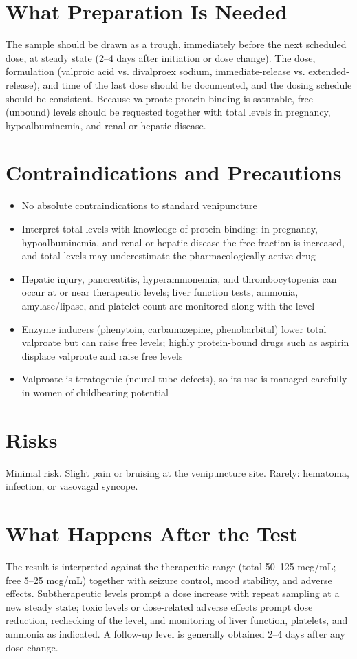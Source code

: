 \section*{What Preparation Is Needed}
The sample should be drawn as a trough, immediately before the next scheduled dose, at steady state (2--4 days after initiation or dose change). The dose, formulation (valproic acid vs. divalproex sodium, immediate-release vs. extended-release), and time of the last dose should be documented, and the dosing schedule should be consistent. Because valproate protein binding is saturable, free (unbound) levels should be requested together with total levels in pregnancy, hypoalbuminemia, and renal or hepatic disease.
\section*{Contraindications and Precautions}
\begin{itemize}
  \item No absolute contraindications to standard venipuncture
  \item Interpret total levels with knowledge of protein binding: in pregnancy, hypoalbuminemia, and renal or hepatic disease the free fraction is increased, and total levels may underestimate the pharmacologically active drug
  \item Hepatic injury, pancreatitis, hyperammonemia, and thrombocytopenia can occur at or near therapeutic levels; liver function tests, ammonia, amylase/lipase, and platelet count are monitored along with the level
  \item Enzyme inducers (phenytoin, carbamazepine, phenobarbital) lower total valproate but can raise free levels; highly protein-bound drugs such as aspirin displace valproate and raise free levels
  \item Valproate is teratogenic (neural tube defects), so its use is managed carefully in women of childbearing potential
\end{itemize}
\section*{Risks}
Minimal risk. Slight pain or bruising at the venipuncture site. Rarely: hematoma, infection, or vasovagal syncope.
\section*{What Happens After the Test}
The result is interpreted against the therapeutic range (total 50--125 mcg/mL; free 5--25 mcg/mL) together with seizure control, mood stability, and adverse effects. Subtherapeutic levels prompt a dose increase with repeat sampling at a new steady state; toxic levels or dose-related adverse effects prompt dose reduction, rechecking of the level, and monitoring of liver function, platelets, and ammonia as indicated. A follow-up level is generally obtained 2--4 days after any dose change.
